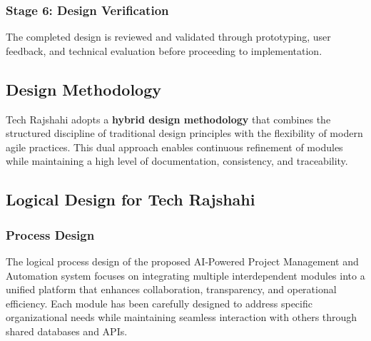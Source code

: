 \documentclass[12pt,a4paper]{article}
\begin{document}
\subsubsection{Stage 6: Design Verification}
The completed design is reviewed and validated through prototyping, user feedback, and technical evaluation before proceeding to implementation.

\subsection{Design Methodology}
Tech Rajshahi adopts a \textbf{hybrid design methodology} that combines the structured discipline of traditional design principles with the flexibility of modern agile practices.  This dual approach enables continuous refinement of modules while maintaining a high level of documentation, consistency, and traceability.

\newpage
\subsection{Logical Design for Tech Rajshahi}

\subsubsection{Process Design}
The logical process design of the proposed AI‑Powered Project Management and Automation system focuses on integrating multiple interdependent modules into a unified platform that enhances collaboration, transparency, and operational efficiency.  Each module has been carefully designed to address specific organizational needs while maintaining seamless interaction with others through shared databases and APIs.
\end{document}
